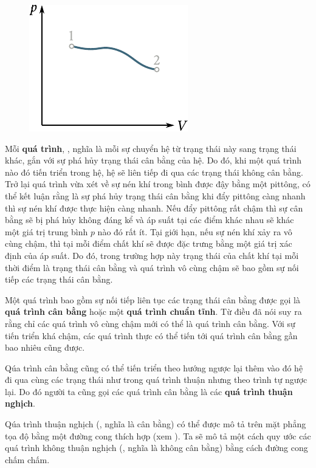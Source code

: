 \begin{figure}[!htb]
	\begin{center}
		\includegraphics[scale=1.0]{figures/ch_10/fig_10_1.pdf}
		\caption[]{}
		\label{fig:10_1}
	\end{center}
\end{figure}

Mỗi \textbf{quá trình}, \ie, nghĩa là mỗi sự chuyển hệ từ trạng thái này sang trạng thái khác, gắn với sự phá hủy trạng thái cân bằng của hệ. Do đó, khi một quá trình nào đó tiến triển trong hệ, hệ sẽ liên tiếp đi qua các trạng thái không cân bằng. Trở lại quá trình vừa xét về sự nén khí trong bình được đậy bằng một pittông, có thể kết luận rằng là sự phá hủy trạng thái cân bằng khi đẩy pittông càng nhanh thì sự nén khí được thực hiện càng nhanh. Nếu đẩy pittông rất chậm thì sự cân bằng sẽ bị phá hủy không đáng kể và áp suất tại các điểm khác nhau sẽ khác một giá trị trung bình $p$ nào đó rất ít. Tại giới hạn, nếu sự nén khí xảy ra vô cùng chậm, thì tại mỗi điểm chất khí sẽ được đặc trưng bằng một giá trị xác định của áp suất. Do đó, trong trường hợp này trạng thái của chất khí tại mỗi thời điểm là trạng thái cân bằng và quá trình vô cùng chậm sẽ bao gồm sự nối tiếp các trạng thái cân bằng.

Một quá trình bao gồm sự nối tiếp liên tục các trạng thái cân bằng được gọi là \textbf{quá trình cân bằng} hoặc một \textbf{quá trình chuẩn tĩnh}. Từ điều đã nói suy ra rằng chỉ các quá trình vô cùng chậm mới có thể là quá trình cân bằng. Với sự tiến triển khá chậm, các quá trình thực có thể tiến tới quá trình cân bằng gần bao nhiêu cũng được.

Qúa trình cân bằng cũng có thể tiến triển theo hướng ngược lại thêm vào đó hệ đi qua cùng các trạng thái như trong quá trình thuận nhưng theo trình tự ngược lại. Do đó người ta cũng gọi các quá trình cân bằng là các \textbf{quá trình thuận nghịch}.

Qúa trình thuận nghịch (\ie, nghĩa là cân bằng) có thể được mô tả trên mặt phẳng tọa độ bằng một đường cong thích hợp (xem ). Ta sẽ mô tả một cách quy ước các quá trình không thuận nghịch  (\ie, nghĩa là không cân bằng) bằng cách đường cong chấm chấm.

